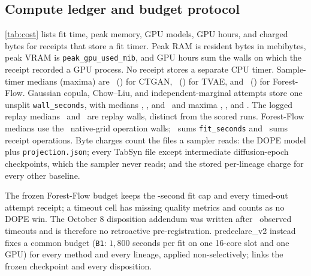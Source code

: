 \documentclass{article}
\begin{document}
\subsection{Compute ledger and budget protocol}
\label{app:bytes}
\cref{tab:cost} lists fit time, peak memory, GPU models, GPU hours, and charged bytes for receipts that store a fit timer. Peak RAM is resident bytes in mebibytes, peak VRAM is \texttt{peak\_gpu\_used\_mib}, and GPU hours sum the walls on which the receipt recorded a GPU process. No receipt stores a separate CPU timer. Sample-timer medians (maxima) are \CtganSampMed\ (\CtganSampMax) for CTGAN, \TvaeSampMed\ (\TvaeSampMax) for TVAE, and \ForestSampMed\ (\ForestSampMax) for Forest-Flow. Gaussian copula, Chow--Liu, and independent-marginal attempts store one unsplit \texttt{wall\_seconds}, with medians \GaussAttemptMed, \ChowAttemptMed, and \IndAttemptMed\ and maxima \GaussAttemptMax, \ChowAttemptMax, and \IndAttemptMax. The logged replay medians \ReplayMedA\ and \ReplayMedB\ are replay walls, distinct from the scored runs. Forest-Flow medians use the \ForestTimeN\ native-grid operation walls; \ForestFitCore\ sums \texttt{fit\_seconds} and \ForestSampleOp\ sums receipt operations. Byte charges count the files a sampler reads: the DOPE model plus \texttt{projection.json}; every TabSyn file except intermediate diffusion-epoch checkpoints, which the sampler never reads; and the stored per-lineage charge for every other baseline.

The frozen Forest-Flow budget keeps the \BaselineForestFitLimit-second fit cap and every timed-out attempt receipt; a timeout cell has missing quality metrics and counts as no DOPE win. The October 8 disposition addendum was written after \BaselineForestTimeouts\ observed timeouts and is therefore no retroactive pre-registration. predeclare\_v2 instead fixes a common budget (\texttt{B1}: $1{,}800$ seconds per fit on one 16-core slot and one GPU) for every method and every lineage, applied non-selectively;  links the frozen checkpoint and every disposition.

\begin{table}[t]
\caption{\textbf{Fit time, memory, GPU, and charged bytes where a fit timer was stored.} The denominator is the receipts that stored a timer. No Holm family.}
\label{tab:cost}
\centering
\scriptsize
\setlength{\tabcolsep}{1.5pt}
\resizebox{\linewidth}{!}{\begin{minipage}{7.16in}\end{minipage}}
\end{table}
\end{document}
